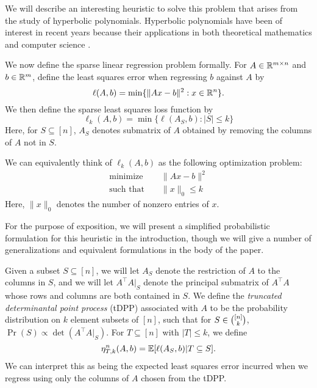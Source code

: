 \documentclass{amsart}
\theoremstyle{definition}
\numberwithin{equation}{section}
\begin{document}
We will describe an interesting heuristic to solve this problem that arises from the study of hyperbolic polynomials. Hyperbolic polynomials have been of interest in recent years because their applications in both theoretical mathematics and computer science \cite{anari2016nash,saunderson2019certifying,borcea2008applications, wagner2011multivariate}.

We now define the sparse linear regression problem formally.
For $A \in \mathbb{R}^{m\times n}$ and $b \in \mathbb{R}^{m}$, define the least squares error when regressing $b$ against $A$ by
\[
    \ell(A, b) = \min \{\|Ax - b\|^2 : x \in \mathbb{R}^n\}.
\]
We then define the sparse least squares loss function by
\begin{equation}
    \ell_k(A,b) = \min \{\ell(A_S, b) : |S| \le k\}\label{eq:sparse}
\end{equation}
Here, for $S \subseteq [n]$, $A_S$ denotes submatrix of $A$ obtained by removing the columns of $A$ not in $S$.

We can equivalently think of $\ell_k(A, b)$ as the following optimization problem:
\begin{equation*}
\begin{aligned}
    \text{minimize} &&\|Ax-b\|^2\\
    \text{such that } &&\|x\|_0 \le k
\end{aligned}
\end{equation*}
Here, $\|x\|_0$ denotes the number of nonzero entries of $x$. 

For the purpose of exposition, we will present a simplified probabilistic formulation for this heuristic in the introduction, though we will give a number of generalizations and equivalent formulations in the body of the paper.

Given a subset $S \subseteq [n]$, we will let $A_S$ denote the restriction of $A$ to the columns in $S$, and we will let $A^{\intercal}A|_S$ denote the principal submatrix of $A^{\intercal}A$ whose rows and columns are both contained in $S$.
We define the \emph{truncated determinantal point process} (tDPP) \cite{anari2016monte} associated with $A$ to be the probability distribution on $k$ element subsets of $[n]$, such that for $S \in \binom{[n]}{k}$, $\Pr(S) \propto \det(A^{\intercal}A|_S)$.
For $T \subseteq [n]$ with $|T| \le k$, we define %
\[
    \eta_{T, k}^n(A,b) = \mathbb{E}[\ell(A_S, b) | T \subseteq S].
\]
We can interpret this as being the expected least squares error incurred when we regress using only the columns of $A$ chosen from the tDPP.
\end{document}
